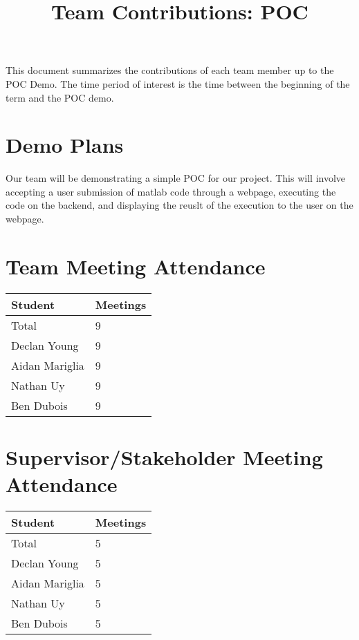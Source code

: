 \documentclass{article}
\title{Team Contributions: POC\\\progname}
\author{\authname}
\date{}
\begin{document}
\maketitle

This document summarizes the contributions of each team member up to the POC
Demo.  The time period of interest is the time between the beginning of the term
and the POC demo.

\section{Demo Plans}

Our team will be demonstrating a simple POC for our project. This will involve accepting a user submission of matlab code through a webpage, executing the code on the backend, and displaying the reuslt of the execution to the user on the webpage.

\section{Team Meeting Attendance}

\begin{table}[H]
\centering
\begin{tabular}{ll}
\toprule
\textbf{Student} & \textbf{Meetings}\\
\midrule
Total & 9\\
Declan Young & 9\\
Aidan Mariglia & 9\\
Nathan Uy & 9\\
Ben Dubois & 9\\
\bottomrule
\end{tabular}
\end{table}

\section{Supervisor/Stakeholder Meeting Attendance}


\begin{table}[H]
\centering
\begin{tabular}{ll}
\toprule
\textbf{Student} & \textbf{Meetings}\\
\midrule
Total & 5\\
Declan Young & 5\\
Aidan Mariglia & 5\\
Nathan Uy & 5\\
Ben Dubois & 5\\
\bottomrule
\end{tabular}
\end{table}
\end{document}
